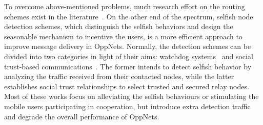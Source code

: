 To overcome above-mentioned problems,
much research effort on the routing schemes
exist in the literature~\cite{DBLP:journals/tpds/ZhuDGDC14,
DBLP:conf/mobicom/MartiGLB00,
DBLP:journals/tmc/LoretiB20}.
On the other end of the spectrum,
selfish node detection schemes,
which distinguish the selfish behaviors
and design the seasonable mechanism to
incentive the users,
is a more efficient approach to improve
message delivery in OppNets.
%
Normally,
the detection schemes
can be divided into two categories
in light of their aims:
watchdog systems~\cite{DBLP:journals/tmc/Hernandez-Orallo15,
DBLP:journals/tie/DiasRXM15,
DBLP:journals/fgcs/JedariXCDTA19}
and social trust-based communications~\cite{DBLP:journals/tdsc/ChoC18,
DBLP:conf/sigcomm/SouzaMSMCC16,
DBLP:journals/tmc/ChoiSLW12}.
The former intends to detect selfish behavior
by analyzing the traffic received
from their contacted nodes,
while the latter establishes social trust relationships
to select trusted and secured relay nodes.
Most of these works
focus on alleviating the selfish behaviours
or stimulating the mobile users participating in cooperation,
but introduce extra detection traffic
and degrade the overall performance of OppNets.


